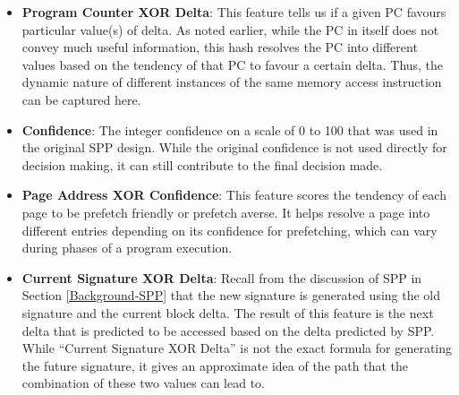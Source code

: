 \begin{itemize}
\item \textbf{Program Counter XOR Delta}: This feature tells us if a given PC
  favours particular value(s) of delta.  As noted earlier, while the PC in
  itself does not convey much useful information, this hash resolves the PC
  into different values based on the tendency of that PC to favour a certain
  delta.  Thus, the dynamic nature of different instances of the same memory
  access instruction can be captured here.

\item \textbf{Confidence}: The integer confidence on a scale of 0 to
  100 that was used in the original SPP design. While the original confidence
  is not used directly for decision making, it can still contribute to the
  final decision made.

\item \textbf{Page Address XOR Confidence}: This feature scores the tendency
  of each page to be prefetch friendly or prefetch averse. It helps resolve a
  page into different entries depending on its confidence for prefetching, which
  can vary during phases of a program execution.

\item \textbf{Current Signature XOR Delta}: Recall from
  the discussion of SPP in Section \ref{Background-SPP} that the new signature
  is generated using the old signature and the current block delta.  
  The result of this feature is the next delta that is predicted to be accessed based on the 
  delta predicted by SPP. While ``Current Signature XOR Delta'' is not the exact formula for generating the future
  signature, it gives an approximate idea of the path that the combination of
  these two values can lead to.



\end{itemize} 

